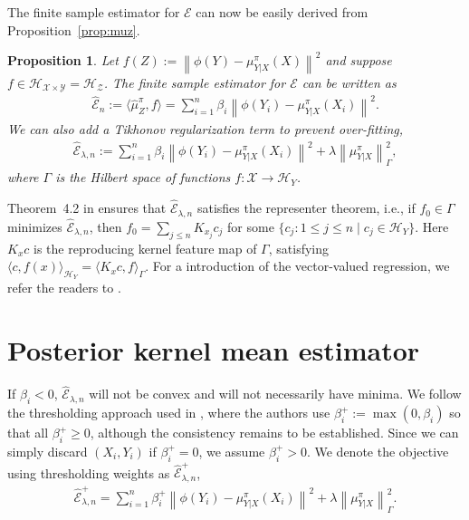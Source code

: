 \documentclass[a4paper]{article}
\renewcommand{\cal}{\mathcal}
\newcommand{\norm}[1]{\left\lVert#1\right\rVert}
\newtheorem{proposition}{Proposition}
\newcommand{\propref}[1]{Proposition~\ref{#1}}
\begin{document}
The finite sample estimator for $\cal{E}$ can now be easily derived from \propref{prop:muz}.
\begin{proposition}
Let $f(Z) := \norm{\phi(Y) - \mu_{Y|X}^\pi(X)}^2$ and suppose $f\in\cal{H}_{\cal{X}\times\cal{Y}} = \cal{H}_{\cal{Z}}$. The finite sample estimator for $\cal{E}$ can be written as
\begin{align}
\widehat{\cal{E}}_n := \langle \widehat{\mu}_Z^\pi, f\rangle = \sum_{i=1}^n \beta_i \norm{\phi(Y_i) - \mu_{Y|X}^\pi(X_i)}^2.
\end{align}
We can also add a Tikhonov regularization term to prevent over-fitting,
\begin{align}
\widehat{\cal{E}}_{\lambda,n} := \sum_{i=1}^n \beta_i \norm{\phi(Y_i) - \mu_{Y|X}^\pi(X_i)}^2 + \lambda \norm{\mu_{Y|X}^\pi}_{\Gamma}^2,
\end{align}
where $\Gamma$ is the Hilbert space of functions $f: \cal{X}\rightarrow \cal{H}_{Y}$.
\end{proposition}

Theorem~4.2 in \cite{micchelli2005learning} ensures that $\widehat{\cal{E}}_{\lambda,n}$ satisfies the representer theorem, i.e., if $f_0 \in \Gamma$ minimizes $\widehat{\cal{E}}_{\lambda,n}$, then $f_0 = \sum_{j\leq n} K_{x_j} c_j$ for some $\{ c_j: 1\leq j\leq n \mid c_j\in\cal{H}_Y\}$. Here $K_{x}c$ is the reproducing kernel feature map of $\Gamma$, satisfying $\langle c,f(x)\rangle_{\cal{H}_Y} = \langle K_x c,f\rangle_\Gamma $. For a introduction of the vector-valued regression, we refer the readers to \cite{micchelli2005learning}.

\section{Posterior kernel mean estimator}
If $\beta_i < 0$, $\widehat{\cal{E}}_{\lambda,n}$ will not be convex and will not necessarily have minima. We follow the thresholding approach used in \cite{nishiyama2012hilbert}, where the authors use $\beta_i^+ := \max(0,\beta_i)$ so that all $\beta_i^+ \geq 0$, although the consistency remains to be established. Since we can simply discard $(X_i,Y_i)$ if $\beta_i^+ = 0$, we assume $\beta_i^+ > 0$. We denote the objective using thresholding weights as $\widehat{\cal{E}}_{\lambda,n}^+$, 
\begin{align}
\widehat{\cal{E}}_{\lambda,n}^+ = \sum_{i=1}^{n} \beta_i^+ \norm{\phi(Y_i) - \mu_{Y|X}^\pi(X_i)}^2 + \lambda\norm{\mu_{Y|X}^\pi}_\Gamma^2.
\end{align}
\end{document}

